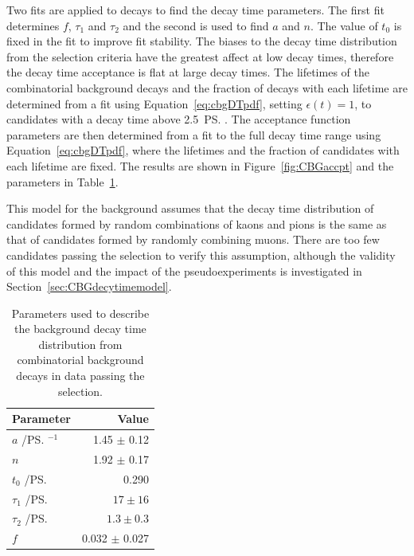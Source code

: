 {Two fits are applied to \bhh decays to find the decay time \pdf parameters. The first fit determines $f$, $\tau_1$ and $\tau_2$ and the second is used to find $a$ and $n$. The value of $t_0$ is fixed in the fit to improve fit stability.
The biases to the decay time distribution from the selection criteria have the greatest affect at low decay times, therefore the decay time acceptance is flat at large decay times. The lifetimes of the combinatorial background decays and the fraction of decays with each lifetime are determined from a fit using Equation~\ref{eq:cbgDTpdf}, setting $\epsilon(t)=1$, to candidates with a decay time above 2.5~\ps. The acceptance function parameters are then determined from a fit to the full decay time range using Equation~\ref{eq:cbgDTpdf}, where the lifetimes and the fraction of candidates with each lifetime are fixed. The results are shown in Figure~\ref{fig:CBGaccpt} and the \pdf parameters in Table~\ref{tab:bkgparams}. %

This model for the background assumes that the decay time distribution of \bhh candidates formed by random combinations of kaons and pions is the same as that of \bsmumu candidates formed by randomly combining muons. There are too few candidates passing the \bsmumu selection to verify this assumption, although the validity of this model and the impact of the pseudoexperiments is investigated in Section~\ref{sec:CBGdecytimemodel}.%


\begin{table}[tbp]
\begin{center}
\begin{tabular}{lr}
\toprule \toprule
Parameter & Value \\
\midrule
$a$ /\ps$^{-1}$ & 1.45 $\pm$ 0.12\\
$n$ & 1.92 $\pm$ 0.17 \\
$t_{0}$ /\ps & 0.290 \\
$\tau_{1}$ /\ps & $17 \pm 16$  \\ 
$\tau_{2}$ /\ps & $1.3 \pm 0.3$ \\
$f$ & 0.032 $\pm$ 0.027 \\
\bottomrule \bottomrule
\end{tabular}
\vspace{0.7cm}             
\caption{Parameters used to describe the background decay time distribution from combinatorial background decays in data passing the \bhh selection.}
\label{tab:bkgparams}
\end{center}
\vspace{-1.0cm}                                                                                                                                               
\end{table}

}
